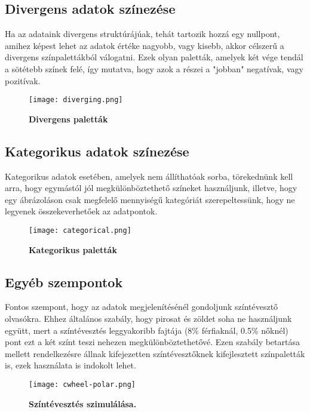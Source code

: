\documentclass[12pt]{extarticle}
\begin{document}
 \subsection{Divergens adatok színezése}
 Ha az adataink divergens struktúrájúak, tehát tartozik hozzá egy nullpont, amihez képest lehet az adatok értéke nagyobb, vagy kisebb, akkor célszerű a divergens színpalettákból válogatni. Ezek olyan paletták, amelyek két vége tendál a sötétebb színek felé, így mutatva, hogy azok a részei a "jobban" negatívak, vagy pozitívak.
 
  \begin{figure}[H]
    \centering
    \texttt{[image: diverging.png]}
    \caption{\textbf{Divergens paletták}}
    \label{fig:GeneralDiagram}
 \end{figure}
 
 \subsection{Kategorikus adatok színezése}
 Kategorikus adatok esetében, amelyek nem állíthatóak sorba, törekednünk kell arra, hogy egymástól jól megkülönböztethető színeket használjunk, illetve, hogy egy ábrázoláson csak megfelelő mennyiségű kategóriát szerepeltessünk, hogy ne legyenek összekeverhetőek az adatpontok.
 
 
 
 \begin{figure}[H]
    \centering
    \texttt{[image: categorical.png]}
    \caption{\textbf{Kategorikus paletták}}
    \label{fig:GeneralDiagram}
 \end{figure}
 
 \subsection{Egyéb szempontok}
 
 Fontos szempont, hogy az adatok megjelenítésénél gondoljunk  színtévesztő olvasókra. Ehhez általános szabály, hogy pirosat és zöldet soha ne használjunk együtt, mert a színtévesztés leggyakoribb fajtája (8\% férfiaknál, 0.5\% nőknél) pont ezt a két színt teszi nehezen megkülönböztethetővé. Ezen szabály betartása mellett rendelkezésre állnak kifejezetten színtévesztőknek kifejlesztett színpaletták is, ezek használata is indokolt lehet. 
 
 \begin{figure}[H]
    \centering
    \texttt{[image: cwheel-polar.png]}
    \caption{\textbf{Színtévesztés szimulálása.}}
    \label{fig:GeneralDiagram}
 \end{figure}
 
\end{document}
